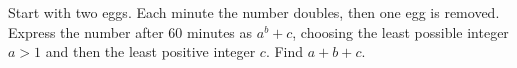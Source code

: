 Start with two eggs. Each minute the number doubles, then one egg is removed. Express the number after 60 minutes as $a^b+c$, choosing the least possible integer $a>1$ and then the least positive integer $c$. Find $a+b+c$.
